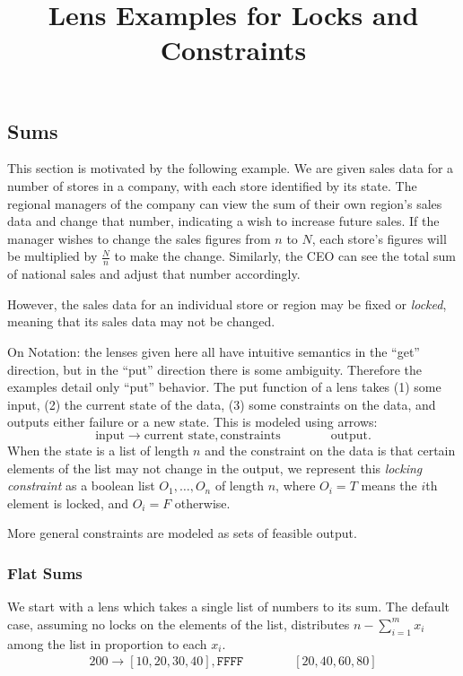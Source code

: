 \documentclass{article}
\title{Lens Examples for Locks and Constraints}
\date{}
\newcommand\F{\texttt F}
\newcommand\form[4]{#1 \rightarrow #2, #3 \qquad \qquad #4}
\begin{document}
\maketitle


\subsection*{Sums}

This section is motivated by the following example. We are given
sales data for a number of stores in a company, with 
each store identified by its state. The regional managers 
of the company can view the sum of their own region's sales 
data and change that number, indicating a wish to increase future
sales. If the manager wishes to change the sales figures from
$n$ to $N$, each store's figures will be multiplied by $\frac N n$
to make the change.
Similarly, the CEO can see the total sum of national
sales and adjust that number accordingly.  


However, the sales data
for an individual store or region may be fixed or \emph{locked},
meaning that its sales data may not be changed.

On Notation: the lenses given here all have intuitive semantics in the 
``get'' direction, but in the ``put'' direction there is some
ambiguity. Therefore the examples detail only ``put'' behavior.
The put function of a lens takes (1) some input, (2) the current state of
the data, (3) some constraints on the data, and outputs either
failure or a new state. This is modeled using arrows:
\[ \form {\text{input}} {\text{current state}} {\text{constraints}} {\text{output}}.\]
When the state is a list of length $n$ and the constraint
on the data is that certain elements of the list may not change
in the output, we represent this \emph{locking constraint} as a boolean list
$O_1,\ldots,O_n$ of length $n$, where $O_i=T$ means the $i$th element
is locked, and $O_i=F$ otherwise. 

More general constraints are modeled as sets of feasible output.

\subsubsection*{Flat Sums}

We start with a lens which takes a single list of numbers
to its sum.
The default case, assuming no locks on the elements of the list,
distributes $n-\sum_{i=1}^m x_i$ among the list in proportion to
each $x_i$.
\begin{align}
    \form {200} {[10,20,30,40]} {\F\F\F\F} {[20,40,60,80]}
\end{align}
\end{document}
